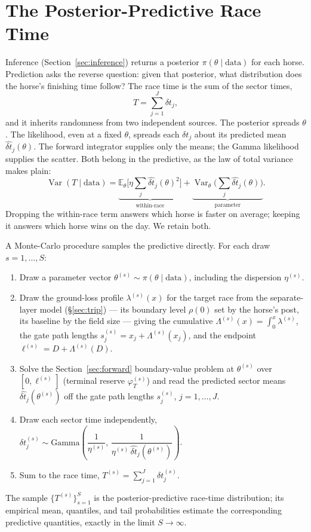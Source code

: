 \documentclass[11pt]{article}
\begin{document}
\section{The Posterior-Predictive Race Time}\label{sec:predictive}

Inference (Section~\ref{sec:inference}) returns a posterior $\pi(\theta \mid \text{data})$ for each horse. Prediction asks the reverse question: given that posterior, what distribution does the horse's finishing time follow? The race time is the sum of the sector times,
\begin{equation}
T = \sum_{j=1}^{J} \delta t_j,
\end{equation}
and it inherits randomness from two independent sources. The posterior spreads $\theta$. The likelihood, even at a fixed $\theta$, spreads each $\delta t_j$ about its predicted mean $\hat{\delta t}_j(\theta)$. The forward integrator supplies only the means; the Gamma likelihood supplies the scatter. Both belong in the predictive, as the law of total variance makes plain:
\begin{equation}
\operatorname{Var}(T \mid \text{data}) = \underbrace{\mathbb{E}_\theta\!\Big[\eta \textstyle\sum_j \hat{\delta t}_j(\theta)^2\Big]}_{\text{within-race}} + \underbrace{\operatorname{Var}_\theta\!\Big(\textstyle\sum_j \hat{\delta t}_j(\theta)\Big)}_{\text{parameter}}.
\end{equation}
Dropping the within-race term answers which horse is faster on average; keeping it answers which horse wins on the day. We retain both.

A Monte-Carlo procedure samples the predictive directly. For each draw $s = 1, \dots, S$:
\begin{enumerate}
\item Draw a parameter vector $\theta^{(s)} \sim \pi(\theta \mid \text{data})$, including the dispersion $\eta^{(s)}$.
\item Draw the ground-loss profile $\lambda^{(s)}(x)$ for the target race from the separate-layer model (\S\ref{sec:trip}) --- its boundary level $\rho(0)$ set by the horse's post, its baseline by the field size --- giving the cumulative $\Lambda^{(s)}(x) = \int_0^x \lambda^{(s)}$, the gate path lengths $s_j^{(s)} = x_j + \Lambda^{(s)}(x_j)$, and the endpoint $\ell^{(s)} = D + \Lambda^{(s)}(D)$.
\item Solve the Section~\ref{sec:forward} boundary-value problem at $\theta^{(s)}$ over $[0, \ell^{(s)}]$ (terminal reserve $\varphi_T^{(s)}$) and read the predicted sector means $\hat{\delta t}_j(\theta^{(s)})$ off the gate path lengths $s_j^{(s)}$, $j = 1, \dots, J$.
\item Draw each sector time independently, $\delta t_j^{(s)} \sim \text{Gamma}\!\left(\dfrac{1}{\eta^{(s)}},\, \dfrac{1}{\eta^{(s)}\, \hat{\delta t}_j(\theta^{(s)})}\right)$.
\item Sum to the race time, $T^{(s)} = \sum_{j=1}^{J} \delta t_j^{(s)}$.
\end{enumerate}
The sample $\{T^{(s)}\}_{s=1}^{S}$ is the posterior-predictive race-time distribution; its empirical mean, quantiles, and tail probabilities estimate the corresponding predictive quantities, exactly in the limit $S \to \infty$.
\end{document}
